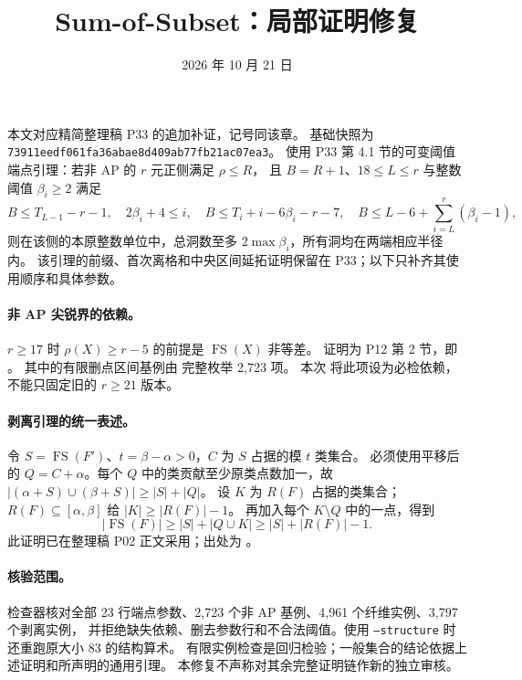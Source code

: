 \documentclass[10pt,a4paper]{article}
\title{Sum-of-Subset：局部证明修复}
\author{}
\date{2026 年 10 月 21 日}
\begin{document}
\maketitle
本文对应精简整理稿 P33 的追加补证，记号同该章。
基础快照为 \texttt{73911eedf061fa36abae8d409ab77fb21ac07ea3}。
使用 P33 第 4.1 节的可变阈值端点引理：若非 AP 的 $r$ 元正侧满足 $\rho\le R$，
且 $B=R+1$、$18\le L\le r$ 与整数阈值 $\beta_i\ge2$ 满足
\[
 B\le T_{L-1}-r-1,\quad 2\beta_i+4\le i,\quad
 B\le T_i+i-6\beta_i-r-7,\quad
 B\le L-6+\sum_{i=L}^r(\beta_i-1),
\]
则在该侧的本原整数单位中，总洞数至多 $2\max\beta_i$，所有洞均在两端相应半径内。
该引理的前缀、首次离格和中央区间延拓证明保留在 P33；以下只补齐其使用顺序和具体参数。


\paragraph{非 AP 尖锐界的依赖。}
$r\ge17$ 时 $\rho(X)\ge r-5$ 的前提是 $\operatorname{FS}(X)$ 非等差。
证明为 P12 第 2 节，即 。
其中的有限删点区间基例由  完整枚举 2,723 项。
本次  将此项设为必检依赖，不能只固定旧的 $r\ge21$ 版本。

\paragraph{剥离引理的统一表述。}
令 $S=\operatorname{FS}(F')$、$t=\beta-\alpha>0$，$C$ 为 $S$ 占据的模 $t$ 类集合。
必须使用平移后的 $Q=C+\alpha$。每个 $Q$ 中的类贡献至少原类点数加一，故
$|(\alpha+S)\cup(\beta+S)|\ge|S|+|Q|$。
设 $K$ 为 $R(F)$ 占据的类集合；$R(F)\subseteq[\alpha,\beta]$ 给 $|K|\ge|R(F)|-1$。
再加入每个 $K\setminus Q$ 中的一点，得到
\[
 |\operatorname{FS}(F)|\ge|S|+|Q\cup K|\ge|S|+|R(F)|-1.
\]
此证明已在整理稿 P02 正文采用；出处为 。

\paragraph{核验范围。}
检查器核对全部 23 行端点参数、2,723 个非 AP 基例、4,961 个纤维实例、3,797 个剥离实例，
并拒绝缺失依赖、删去参数行和不合法阈值。使用 \texttt{--structure} 时还重跑原大小 83 的结构算术。
有限实例检查是回归检验；一般集合的结论依据上述证明和所声明的通用引理。
本修复不声称对其余完整证明链作新的独立审核。
\end{document}
